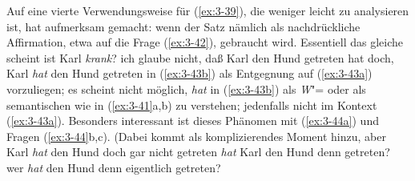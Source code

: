 \documentclass[output=paper]{langsci/langscibook}
\begin{document}
Auf eine vierte Verwendungsweise für (\ref{ex:3-39}), die weniger leicht zu
analysieren ist, hat \citet[309f]{Fuchs76} aufmerksam gemacht:
wenn der Satz nämlich als nachdrückliche Affirmation, etwa auf die
Frage (\ref{ex:3-42}), gebraucht wird. Essentiell das gleiche scheint
\ea
\label{ex:3-42}
ist Karl \textit{krank}?
\z
\eal \label{ex:3-43}
\ex
\label{ex:3-43a}
ich glaube nicht, daß Karl den Hund getreten hat
\ex
\label{ex:3-43b}
doch, Karl \textit{hat} den Hund getreten
\zl
\largerpage
in (\ref{ex:3-43b}) als Entgegnung auf (\ref{ex:3-43a}) vorzuliegen; es scheint nicht
möglich, \textit{hat} in (\ref{ex:3-43b}) als \textit{W}"= oder als semantischen  wie
in (\ref{ex:3-41}a,b) zu verstehen; jedenfalls nicht im Kontext (\ref{ex:3-43a}). Besonders interessant ist dieses Phänomen mit  (\ref{ex:3-44a}) und
Fragen (\ref{ex:3-44}b,c). (Dabei kommt als komplizierendes Moment hinzu,
\eal \label{ex:3-44}
\ex
\label{ex:3-44a}
aber Karl \textit{hat} den Hund doch gar nicht getreten
\ex
\label{ex:3-44b}
\textit{hat} Karl den Hund denn getreten?
\ex
\label{ex:3-44c}
wer \textit{hat} den Hund denn eigentlich getreten?
\zl
\end{document}
